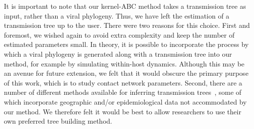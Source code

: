 
It is important to note that our kernel-ABC method takes a transmission tree as
input, rather than a viral phylogeny. Thus, we have left the estimation of a
transmission tree up to the user. There were two reasons for this choice. First
and foremost, we wished again to avoid extra complexity and keep the number of
estimated parameters small. In theory, it is possible to incorporate the
process by which a viral phylogeny is generated along with a transmission tree
into our method, for example by simulating within-host dynamics. Although this
may be an avenue for future extension, we felt that it would obscure the
primary purpose of this work, which is to study contact network parameters.
Second, there are a number of different methods available for inferring
transmission trees~\autocite{didelot2014bayesian, ypma2012unravelling,
jombart2011reconstructing, cottam2008integrating, poon2015phylodynamic}, some
of which incorporate geographic and/or epidemiological data not accommodated by
our method. We therefore felt it would be best to allow researchers to use
their own preferred tree building method.
